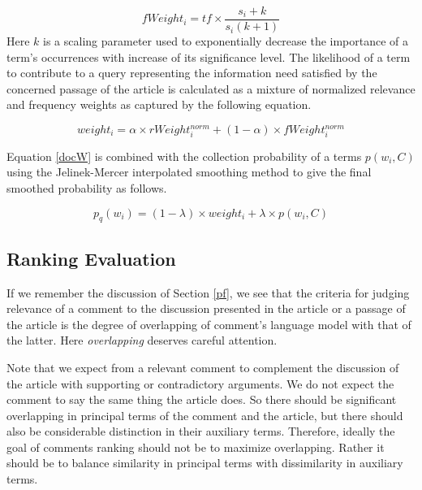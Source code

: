 \documentclass[article]{IEEEtran}
\begin{document}
\begin{equation}
\label{fweight}
fWeight_i = tf \times {\frac{s_i + k}{s_i (k + 1)}}
\end{equation}   
Here $k$ is a scaling parameter used to exponentially decrease the importance of a term's occurrences with increase of its significance level.
The likelihood of a term to contribute to a query representing the information need satisfied by the concerned passage of the article is calculated as a mixture of normalized relevance and frequency weights as captured by the following equation.

\begin{equation}
\label{docW}
weight_i = \alpha \times rWeight_i^{norm} + (1 - \alpha) \times fWeight_i^{norm}
\end{equation}

Equation \ref{docW} is combined with the collection probability of a terms $p(w_i, C)$ using the Jelinek-Mercer interpolated smoothing method \cite{1371580} to give the final smoothed probability as follows.   

\begin{equation}
\label{wProb}
p_q(w_i) = (1 - \lambda) \times weight_i + \lambda \times p(w_i, C) 
\end{equation}



\subsection{Ranking Evaluation}
If we remember the discussion of Section \ref{pf}, we see that the criteria for judging relevance of a comment to the discussion presented in the article or a passage of the article is the degree of overlapping of comment's language model with that of the latter. Here \textit{overlapping} deserves careful attention.

Note that we expect from a relevant comment to complement the discussion of the article with supporting or contradictory arguments. We do not expect the comment to say the same thing the article does. So there should be significant overlapping in principal terms of the comment and the article, but there should also be considerable distinction in their auxiliary terms. Therefore, ideally the goal of comments ranking should not be to maximize overlapping. Rather it should be to balance similarity in principal terms with dissimilarity in auxiliary terms.
\end{document}
